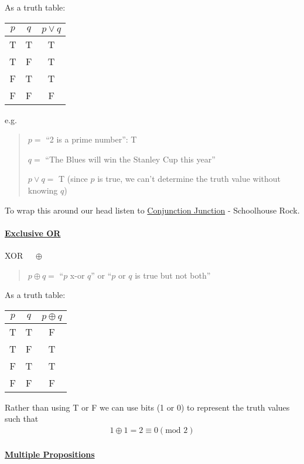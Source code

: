 \documentclass[../main.tex]{subfiles}
\begin{document}
As a truth table:
\begin{table}[ht]
    \centering
    \begin{tabular}{c|c|c}
        $p$ & $q$ & $p \lor q$ \\
        \hline
        T & T & T \\
        T & F & T \\
        F & T & T \\
        F & F & F
    \end{tabular}
\end{table}

e.g.
\begin{quote}
    $p = $ ``2 is a prime number'': T

    $q = $ ``The Blues will win the Stanley Cup this year''

    $p \lor q = $ T (since $p$ is true, we can't determine the truth value without knowing $q$)
\end{quote}

To wrap this around our head listen to
\href{https://youtu.be/LjdCFat9rjI?si=1ZF7paZ8Hdt_-iI7}{Conjunction Junction} - Schoolhouse Rock.

\paragraph{\underline{Exclusive OR}} XOR $\quad \oplus$

\begin{quote}
    $p \oplus q =$ ``$p$ x-or $q$'' 
    or ``$p$ or $q$ is true but not both''
\end{quote}

As a truth table:
\begin{table}[ht]
    \centering
    \begin{tabular}{c|c|c}
        $p$ & $q$ & $p \oplus q$ \\
        \hline
        T & T & F \\
        T & F & T \\
        F & T & T \\
        F & F & F
    \end{tabular}
\end{table}

Rather than using T or F we can use bits (1 or 0) to represent the truth values such that
\begin{align*}
    1 \oplus 1 = 2 \equiv 0 (\text{mod } 2)
\end{align*}

\paragraph{\underline{Multiple Propositions}}
\end{document}
